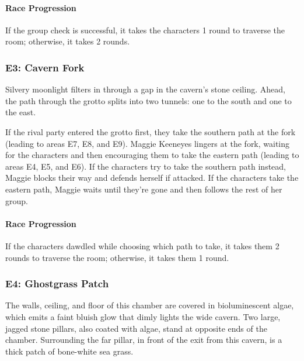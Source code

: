 \documentclass[letterpaper, 11pt, bg=full, twocolumn]{dndbook}
\begin{document}
\paragraph{Race Progression}

If the group check is successful, it takes the characters 1 round to traverse the room; otherwise, it takes 2 rounds.

\subsubsection{E3: Cavern Fork}

\begin{DndReadAloud}
Silvery moonlight filters in through a gap in the cavern's stone ceiling. Ahead, the path through the grotto splits into two tunnels: one to the south and one to the east.
\end{DndReadAloud}

If the rival party entered the grotto first, they take the southern path at the fork (leading to areas E7, E8, and E9). Maggie Keeneyes lingers at the fork, waiting for the characters and then encouraging them to take the eastern path (leading to areas E4, E5, and E6). If the characters try to take the southern path instead, Maggie blocks their way and defends herself if attacked. If the characters take the eastern path, Maggie waits until they're gone and then follows the rest of her group.

\paragraph{Race Progression}

If the characters dawdled while choosing which path to take, it takes them 2 rounds to traverse the room; otherwise, it takes them 1 round.

\subsubsection{E4: Ghostgrass Patch}

\begin{DndReadAloud}
The walls, ceiling, and floor of this chamber are covered in bioluminescent algae, which emits a faint bluish glow that dimly lights the wide cavern. Two large, jagged stone pillars, also coated with algae, stand at opposite ends of the chamber. Surrounding the far pillar, in front of the exit from this cavern, is a thick patch of bone-white sea grass.
\end{DndReadAloud}
\end{document}
